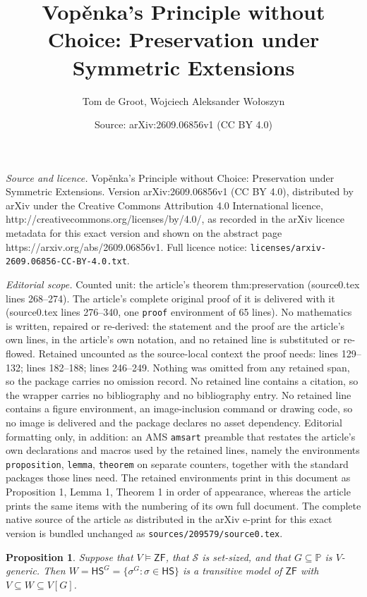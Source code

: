 \documentclass[10pt,a4paper]{amsart}
\title{Vop\v{e}nka's Principle without Choice: Preservation under Symmetric Extensions}
\author{Tom de Groot, Wojciech Aleksander Wo{\l}oszyn}
\date{Source: arXiv:2609.06856v1 (CC BY 4.0)}
\newtheorem{proposition}{Proposition}
\newcommand{\HS}{\mathsf{HS}}
\newcommand{\ZF}{\mathsf{ZF}}
\begin{document}
\maketitle

\noindent\emph{Source and licence.} Vop\v{e}nka's Principle without Choice: Preservation under Symmetric Extensions. Version arXiv:2609.06856v1 (CC BY 4.0), distributed by arXiv under the Creative Commons Attribution 4.0 International licence, http://creativecommons.org/licenses/by/4.0/, as recorded in the arXiv licence metadata for this exact version and shown on the abstract page https://arxiv.org/abs/2609.06856v1. Full licence notice: \texttt{licenses/arxiv-2609.06856-CC-BY-4.0.txt}.\par\smallskip

\noindent\textit{Editorial scope.} Counted unit: the article's theorem thm:preservation (source0.tex lines 268--274). The article's complete original proof of it is delivered with it (source0.tex lines 276--340, one \texttt{proof} environment of 65 lines). No mathematics is written, repaired or re-derived: the statement and the proof are the article's own lines, in the article's own notation, and no retained line is substituted or re-flowed.  Retained uncounted as the source-local context the proof needs: lines 129--132; lines 182--188; lines 246--249.  Nothing was omitted from any retained span, so the package carries no omission record.  No retained line contains a citation, so the wrapper carries no bibliography and no bibliography entry.  No retained line contains a figure environment, an image-inclusion command or drawing code, so no image is delivered and the package declares no asset dependency.  Editorial formatting only, in addition: an AMS \texttt{amsart} preamble that restates the article's own declarations and macros used by the retained lines, namely the environments \texttt{proposition}, \texttt{lemma}, \texttt{theorem} on separate counters, together with the standard packages those lines need.  The retained environments print in this document as Proposition 1, Lemma 1, Theorem 1 in order of appearance, whereas the article prints the same items with the numbering of its own full document.  The complete native source of the article as distributed in the arXiv e-print for this exact version is bundled unchanged as \texttt{sources/209579/source0.tex}.
\begin{proposition}\label{prop:symmetric-ZF}
Suppose that $V\models\ZF$, that $\mathscr S$ is set-sized, and that $G\subseteq\mathbb P$ is $V$-generic.  Then
$W=\HS^G=\{\sigma^G:\sigma\in\HS\}$ is a transitive model of $\ZF$ with $V\subseteq W\subseteq V[G]$.
\end{proposition}
\end{document}

